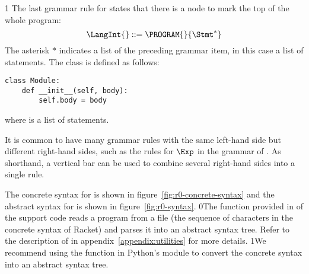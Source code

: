 \documentclass[7x10]{TimesAPriori_MIT}%
\def\racketEd{0}
\def\pythonEd{1}
\def\edition{1}
\newcommand{\racket}[1]{{\if\edition\racketEd{#1}\fi}}
\newcommand{\pythonColor}[0]{}
\newcommand{\python}[1]{{\if\edition\pythonEd\pythonColor #1\fi}}
\numberwithin{theorem}{chapter}
\numberwithin{definition}{chapter}
\numberwithin{equation}{chapter}
\begin{document}
{\if\edition\pythonEd\pythonColor
The last grammar rule for \LangInt{} states that there is a
 node to mark the top of the whole program:
\[
  \LangInt{} ::= \PROGRAM{}{\Stmt^{*}}
\]
The asterisk $*$ indicates a list of the preceding grammar item, in
this case a list of statements.
%
The  class is defined as follows:
\begin{lstlisting}
class Module:
    def __init__(self, body):
        self.body = body
\end{lstlisting}
where  is a list of statements.
\fi}

It is common to have many grammar rules with the same left-hand side
but different right-hand sides, such as the rules for $\Exp$ in the
grammar of \LangInt{}. As shorthand, a vertical bar can be used to
combine several right-hand sides into a single rule.

The concrete syntax for \LangInt{} is shown in
figure~\ref{fig:r0-concrete-syntax} and the abstract syntax for
\LangInt{} is shown in figure~\ref{fig:r0-syntax}. %
%
\racket{The  function provided in
  \code{utilities.rkt} of the support code reads a program from a file
  (the sequence of characters in the concrete syntax of Racket) and
  parses it into an abstract syntax tree. Refer to the description of
  \code{read-program} in appendix~\ref{appendix:utilities} for more
  details.}
%
\python{We recommend using the  function in Python's
  \code{ast} module to convert the concrete syntax into an abstract
  syntax tree.}

\newcommand{\LintGrammarRacket}{
  \begin{array}{rcl}
    \Type &::=& \key{Integer} \\
    \Exp{} &::=& \Int{} \MID \CREAD \MID \CNEG{\Exp} \MID \CADD{\Exp}{\Exp}
      \MID \CSUB{\Exp}{\Exp}
  \end{array}
}
\newcommand{\LintASTRacket}{
  \begin{array}{rcl}
    \Type &::=& \key{Integer} \\
    \Exp{} &::=& \INT{\Int} \MID \READ{} \\
           &\MID& \NEG{\Exp} \MID \ADD{\Exp}{\Exp} \MID \SUB{\Exp}{\Exp}
  \end{array}
}
\newcommand{\LintGrammarPython}{
\begin{array}{rcl}
  \Exp &::=& \Int \MID \key{input\_int}\LP\RP \MID \key{-}\;\Exp \MID \Exp \; \key{+} \; \Exp \MID \Exp \; \key{-} \; \Exp \MID \LP\Exp\RP \\
  \Stmt &::=& \key{print}\LP \Exp \RP \MID \Exp
\end{array}
}
\newcommand{\LintASTPython}{
  \begin{array}{rcl}
  \Exp{} &::=& \INT{\Int} \MID \READ{} \\
         &\MID& \UNIOP{\key{USub()}}{\Exp} \MID \BINOP{\Exp}{\key{Add()}}{\Exp}\\
         &\MID& \BINOP{\Exp}{\key{Sub()}}{\Exp}\\
  \Stmt{} &::=& \PRINT{\Exp} \MID \EXPR{\Exp} 
\end{array}
}
\end{document}
